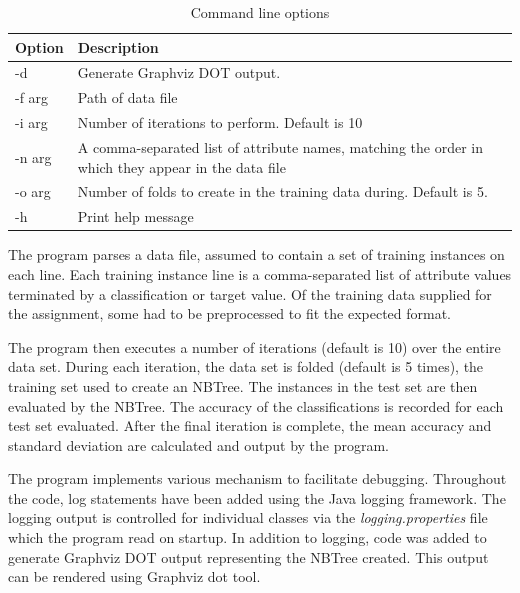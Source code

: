 \documentclass[10pt]{report}
\begin{document}
\begin{table}[h]
  \centering
  \begin{tabular}{ |l|p{10cm}|} 
    \hline
    Option & Description \\ \hline
    -d          &  Generate Graphviz DOT output. \\ \hline
    -f \<arg\>  &  Path of data file \\ \hline
    -i \<arg\>  &  Number of iterations to perform. Default is 10 \\ \hline
    -n \<arg\>  &  A comma-separated list of attribute names, matching
    the order in which they appear in the data file \\ \hline
    -o \<arg\>  &  Number of folds to create in the training data during. Default is 5. \\ \hline
    -h          &  Print help message \\ \hline
  \end{tabular}
  \caption{Command line options}
  \label{tab:commandline}
\end{table}

The program parses a data file, assumed to contain a set of training
instances on each line. Each training instance line is a
comma-separated list of attribute values terminated by a
classification or target value. Of the training data supplied for the
assignment, some had to be preprocessed to fit the expected format.

The program then executes a number of iterations (default is 10) over
the entire data set. During each iteration, the data set is folded
(default is 5 times), the training set used to create an NBTree. The
instances in the test set are then evaluated by the NBTree. The
accuracy of the classifications is recorded 
for each test set evaluated. After the final iteration is complete,
the mean accuracy and standard deviation are calculated and output by
the program.

The program implements various mechanism to facilitate
debugging. Throughout the code, log statements have been added using
the Java logging framework. The logging output is controlled for
individual classes via the \textit{logging.properties} file which the program
read on startup. In addition to logging, code was added to generate
Graphviz DOT \cite{Graphviz2001} output representing
the NBTree created. This output can be rendered using Graphviz
dot tool. 
\end{document}
